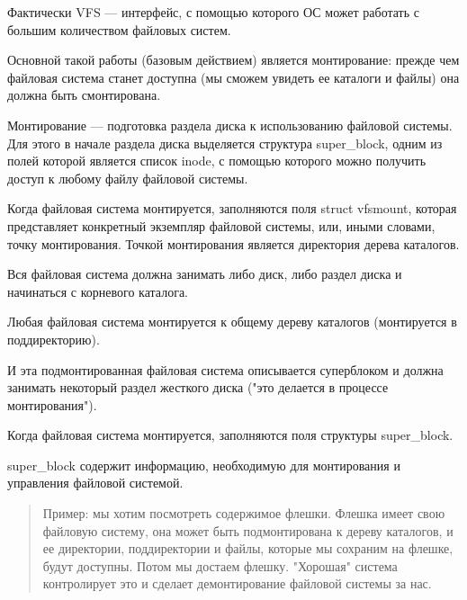 Фактически VFS — интерфейс, с помощью которого ОС может работать с большим количеством файловых систем.

Основной такой работы (базовым действием) является монтирование: прежде чем файловая система станет доступна (мы сможем увидеть ее каталоги и файлы) она должна быть смонтирована.

Монтирование — подготовка раздела диска к использованию файловой системы. Для этого в начале раздела диска выделяется структура super\_block, одним из полей которой является список inode, с помощью которого можно получить доступ к любому файлу файловой системы.

Когда файловая система монтируется, заполняются поля struct vfsmount, которая представляет конкретный экземпляр файловой системы, или, иными словами, точку монтирования. Точкой монтирования является директория дерева каталогов.

Вся файловая система должна занимать либо диск, либо раздел диска и начинаться с корневого каталога.

Любая файловая система монтируется к общему дереву каталогов (монтируется в поддиректорию).

И эта подмонтированная файловая система описывается суперблоком и должна занимать некоторый раздел жесткого диска ("это делается в процессе монтирования").

Когда файловая система монтируется, заполняются поля структуры super\_block.

super\_block содержит информацию, необходимую для монтирования и управления файловой системой.

\begin{quote}
	Пример: мы хотим посмотреть содержимое флешки. Флешка имеет свою файловую систему, она может быть подмонтирована к дереву каталогов, и ее директории, поддиректории и файлы, которые мы сохраним на флешке, будут доступны. Потом мы достаем флешку. "Хорошая" система контролирует это и сделает демонтирование файловой системы за нас.
\end{quote}

